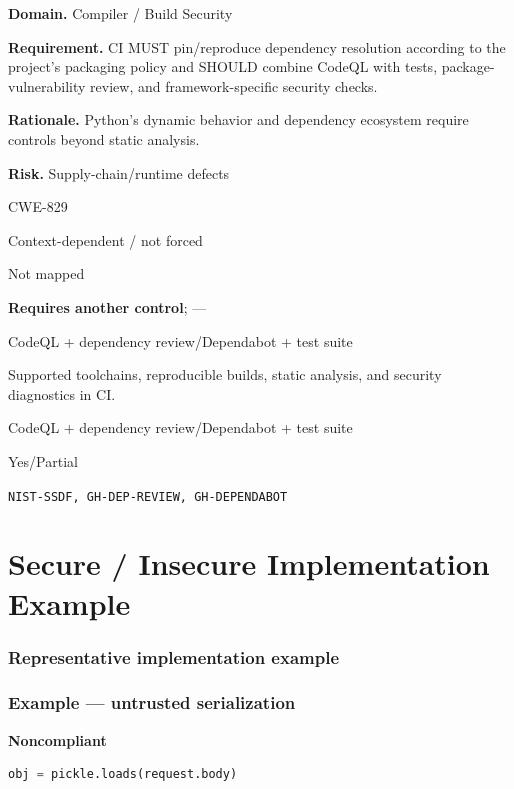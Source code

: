 \documentclass[10pt,letterpaper]{article}
\newcommand{\prioritybadge}[2]{\tcbox[on line,boxrule=0pt,arc=1.2mm,boxsep=0.7mm,left=1mm,right=1mm,top=0.4mm,bottom=0.4mm,colback=#2!12,coltext=#2]{\scriptsize\bfseries #1}}
\begin{document}
\begin{rulebox}[title={\texttt{SCS-PY-BUILD-001} \hfill \prioritybadge{High Priority}{High}}]
\textbf{Domain.} Compiler / Build Security

\textbf{Requirement.} CI MUST pin/reproduce dependency resolution according to the project's packaging policy and SHOULD combine CodeQL with tests, package-vulnerability review, and framework-specific security checks.

\textbf{Rationale.} Python's dynamic behavior and dependency ecosystem require controls beyond static analysis.

\textbf{Risk.} Supply-chain/runtime defects

\begin{description}[leftmargin=2.65cm,labelwidth=2.3cm,style=nextline,itemsep=1pt,topsep=3pt]
  \item[CWE] CWE-829
  \item[OWASP] Context-dependent / not forced
  \item[CERT] Not mapped
  \item[CodeQL] \textbf{Requires another control}; ---
  \item[Enforcement] CodeQL + dependency review/Dependabot + test suite
  \item[Prevention] Supported toolchains, reproducible builds, static analysis, and security diagnostics in CI.
  \item[Verification] CodeQL + dependency review/Dependabot + test suite
  \item[Automation] Yes/Partial
  \item[Sources] \texttt{NIST-SSDF, GH-DEP-REVIEW, GH-DEPENDABOT}
\end{description}
\end{rulebox}
\section{Secure / Insecure Implementation Example}
\subsubsection*{Representative implementation example}
\subsubsection*{Example --- untrusted serialization}

\textbf{Noncompliant}\par
\begin{lstlisting}[language={Python}]
obj = pickle.loads(request.body)
\end{lstlisting}
\end{document}
